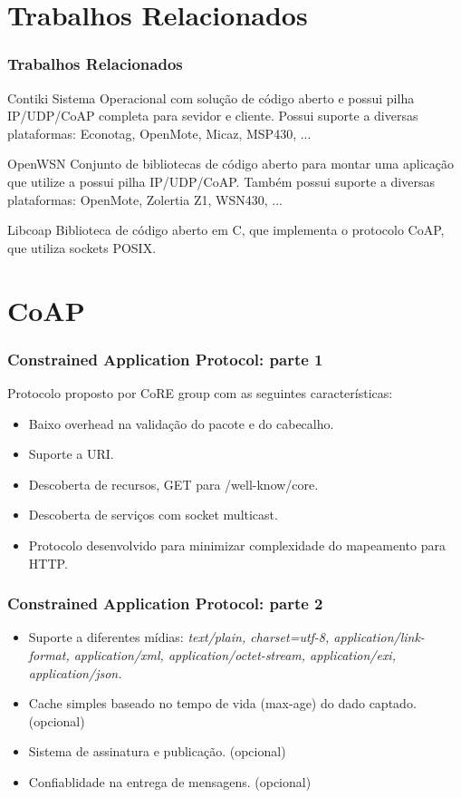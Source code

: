 \documentclass{beamer}
\begin{document}

\section{Trabalhos Relacionados}
\begin{frame}
\frametitle{Trabalhos Relacionados}
\begin{block}{Contiki}
Sistema Operacional com solução de código aberto e possui pilha IP/UDP/CoAP completa para sevidor e cliente.
Possui suporte a diversas plataformas: Econotag, OpenMote, Micaz, MSP430, ...
\end{block}

\begin{block}{OpenWSN}
Conjunto de bibliotecas de código aberto para montar uma aplicação que utilize a possui pilha IP/UDP/CoAP.
Também possui suporte a diversas plataformas: OpenMote, Zolertia Z1, WSN430, ...
\end{block}

\begin{block}{Libcoap}
Biblioteca de código aberto em C, que implementa o protocolo CoAP, que utiliza sockets POSIX.
\end{block}
\end{frame}


\section{CoAP}
\begin{frame}
\frametitle{Constrained Application Protocol: parte 1}
Protocolo proposto por CoRE group com as seguintes características:
\begin{itemize}
    \item Baixo overhead na validação do pacote e do cabecalho.
    \item Suporte a URI.
    \item Descoberta de recursos, GET para /well-know/core.
    \item Descoberta de serviços com socket multicast. 
    \item Protocolo desenvolvido para minimizar complexidade do mapeamento para HTTP.
\end{itemize}
\end{frame}

\begin{frame}
\frametitle{Constrained Application Protocol: parte 2}
\begin{itemize}
    \item Suporte a diferentes mídias: \textit{text/plain, charset=utf-8, application/link-format, application/xml, application/octet-stream, application/exi, application/json.}
    \item Cache simples baseado no tempo de vida (max-age) do dado captado. (opcional)
    \item Sistema de assinatura e publicação. (opcional)
    \item Confiablidade na entrega de mensagens. (opcional) 
\end{itemize}
\end{frame}
\end{document}
